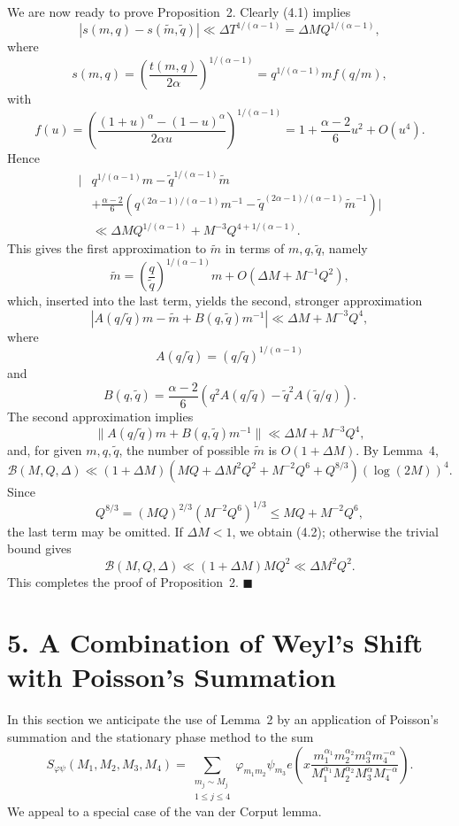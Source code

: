 \documentclass[10pt]{article}
\begin{document}
We are now ready to prove Proposition~2. Clearly (4.1) implies
\[
  |s(m,q)-s(\widetilde m,\widetilde q)|
  \ll \Delta T^{1/(\alpha-1)}
  =\Delta M Q^{1/(\alpha-1)},
\]
where
\[
  s(m,q)=\left(\frac{t(m,q)}{2\alpha}\right)^{1/(\alpha-1)}
  =q^{1/(\alpha-1)}m f(q/m),
\]
with
\[
  f(u)=\left(\frac{(1+u)^\alpha-(1-u)^\alpha}{2\alpha u}\right)^{1/(\alpha-1)}
  =1+\frac{\alpha-2}{6}u^2+O(u^4).
\]
Hence
\[
  \begin{aligned}
  \Bigg|{}&q^{1/(\alpha-1)}m
  -\widetilde q^{1/(\alpha-1)}\widetilde m\\
  &+\frac{\alpha-2}{6}
    \left(q^{(2\alpha-1)/(\alpha-1)}m^{-1}
    -\widetilde q^{(2\alpha-1)/(\alpha-1)}\widetilde m^{-1}\right)
  \Bigg|\\
  &\ll \Delta M Q^{1/(\alpha-1)}
       +M^{-3}Q^{4+1/(\alpha-1)}.
  \end{aligned}
\]
This gives the first approximation to $\widetilde m$ in terms of
$m,q,\widetilde q$, namely
\[
  \widetilde m
  =\left(\frac q{\widetilde q}\right)^{1/(\alpha-1)}m
   +O(\Delta M+M^{-1}Q^2),
\]
which, inserted into the last term, yields the second, stronger
approximation
\[
  |A(q/\widetilde q)m-\widetilde m+B(q,\widetilde q)m^{-1}|
  \ll\Delta M+M^{-3}Q^4,
\]
where
\[
  A(q/\widetilde q)=(q/\widetilde q)^{1/(\alpha-1)}
\]
and
\[
  B(q,\widetilde q)=\frac{\alpha-2}{6}
  \left(q^2A(q/\widetilde q)
       -\widetilde q^2A(\widetilde q/q)\right).
\]
The second approximation implies
\begin{equation*}
  \|A(q/\widetilde q)m+B(q,\widetilde q)m^{-1}\|
  \ll\Delta M+M^{-3}Q^4,
  \tag{4.3}
\end{equation*}
and, for given $m,q,\widetilde q$, the number of possible
$\widetilde m$ is $O(1+\Delta M)$. By Lemma~4,
\[
  \mathscr B(M,Q,\Delta)
  \ll(1+\Delta M)
  \left(MQ+\Delta M^2Q^2+M^{-2}Q^6+Q^{8/3}\right)(\log(2M))^4.
\]
Since
\[
  Q^{8/3}=(MQ)^{2/3}(M^{-2}Q^6)^{1/3}
  \le MQ+M^{-2}Q^6,
\]
the last term may be omitted. If $\Delta M<1$, we obtain (4.2);
otherwise the trivial bound gives
\[
  \mathscr B(M,Q,\Delta)
  \ll(1+\Delta M)MQ^2\ll\Delta M^2Q^2.
\]
This completes the proof of Proposition~2. \(\blacksquare\)

\section*{5. A Combination of Weyl's Shift with Poisson's Summation}
In this section we anticipate the use of Lemma~2 by an application of
Poisson's summation and the stationary phase method to the sum
\[
S_{\varphi\psi}(M_1,M_2,M_3,M_4)
 =\sum_{\substack{m_j\sim M_j\\1\le j\le4}}
   \varphi_{m_1m_2}\psi_{m_3}
   e\left(x\frac{m_1^{\alpha_1}m_2^{\alpha_2}m_3^\alpha m_4^{-\alpha}}
                  {M_1^{\alpha_1}M_2^{\alpha_2}M_3^\alpha M_4^{-\alpha}}\right).
\]
We appeal to a special case of the van der Corput lemma.
\end{document}
